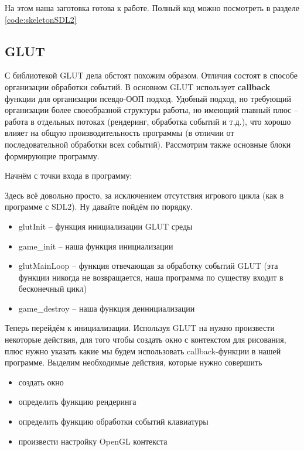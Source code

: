 На этом наша заготовка готова к работе. Полный код можно посмотреть в разделе \ref{code:skeletonSDL2}

\subsection{GLUT}
С библиотекой GLUT дела обстоят похожим образом. Отличия состоят в способе организации обработки событий.
В основном GLUT использует \textbf{callback} функции для организации псевдо-ООП подход. Удобный подход, но 
требующий организации более своеобразной структуры работы, но имеющий главный плюс -- работа в отдельных 
потоках (рендеринг, обработка событий и т.д.), что хорошо влияет на общую производительность программы 
(в отличии от последовательной обработки всех событий). Рассмотрим также основные блоки формирующие 
программу.

Начнём с точки входа в программу:


Здесь всё довольно просто, за исключением отсутствия игрового цикла (как в программе с SDL2). Ну давайте 
пойдём по порядку.
\begin{itemize}\itemsep-5pt
    \item glutInit -- функция инициализации GLUT среды
    \item game\_init -- наша функция инициализации
    \item glutMainLoop -- функция отвечающая за обработку событий GLUT (эта функции никогда не возвращается, 
        наша программа по существу входит в бесконечный цикл)
    \item game\_destroy -- наша функция деинициализации
\end{itemize}

Теперь перейдём к инициализации. Используя GLUT на нужно произвести некоторые действия, для того чтобы 
создать окно с контекстом для рисования, плюс нужно указать какие мы будем использовать callback-функции 
в нашей программе. Выделим необходимые действия, которые нужно совершить

\newpage

\begin{itemize}\itemsep-5pt
    \item создать окно
    \item определить функцию рендеринга
    \item определить функцию обработки событий клавиатуры
    \item произвести настройку OpenGL контекста
\end{itemize} 

